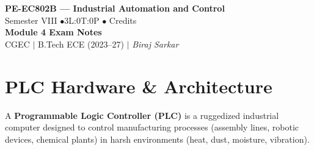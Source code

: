 \documentclass[12pt,a4paper]{article}
\begin{document}

\begin{center}
  {\LARGE\bfseries\color{myred} PE-EC802B --- Industrial Automation and Control}\\[5pt]
  {\normalsize\color{mydark} Semester VIII \quad$\bullet$\quad 3L:0T:0P \quad$\bullet$ Credits}\\[3pt]
  {\normalsize\color{myteal}\textbf{Module 4 Exam Notes}}\\[3pt]
  {\small\color{mydark} CGEC \;$|$\; B.Tech ECE (2023--27) \;$|$\; \textit{Biraj Sarkar}}
\end{center}
\vspace{2pt}
\noindent{\color{myred}\rule{\linewidth}{1.5pt}}
\vspace{2pt}

\hypersetup{linkcolor=mydark}
\tableofcontents
\hypersetup{linkcolor=myteal}
\newpage

\section{PLC Hardware \& Architecture}

A \textbf{Programmable Logic Controller (PLC)} is a ruggedized industrial computer designed to control manufacturing processes (assembly lines, robotic devices, chemical plants) in harsh environments (heat, dust, moisture, vibration).
\end{document}
